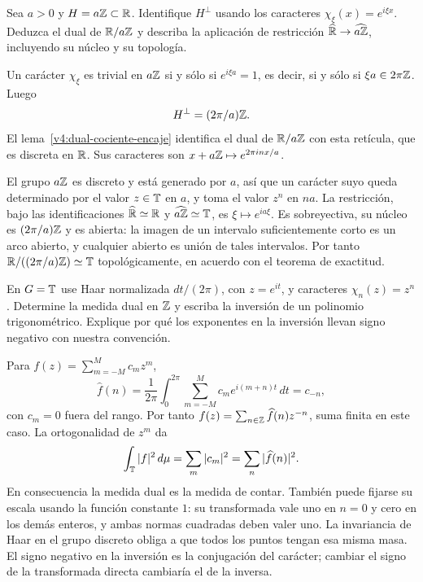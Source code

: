 \begin{ejercicio}\label{ej:v4-ampl-16-2}
Sea $a>0$ y $H=a\mathbb Z\subset\mathbb R$. Identifique $H^\perp$ usando los caracteres $\chi_\xi(x)=e^{i\xi x}$. Deduzca el dual de $\mathbb R/a\mathbb Z$ y describa la aplicación de restricción $\widehat{\mathbb R}\to\widehat{a\mathbb Z}$, incluyendo su núcleo y su topología.
\end{ejercicio}
\begin{solucion}
Un carácter $\chi_\xi$ es trivial en $a\mathbb Z$ si y sólo si $e^{i\xi a}=1$, es decir, si y sólo si $\xi a\in2\pi\mathbb Z$. Luego
\[
 H^\perp=(2\pi/a)\mathbb Z.
\]
El lema~\ref{v4:dual-cociente-encaje} identifica el dual de $\mathbb R/a\mathbb Z$ con esta retícula, que es discreta en $\mathbb R$. Sus caracteres son $x+a\mathbb Z\mapsto e^{2\pi i n x/a}$.

El grupo $a\mathbb Z$ es discreto y está generado por $a$, así que un carácter suyo queda determinado por el valor $z\in\mathbb T$ en $a$, y toma el valor $z^n$ en $na$. La restricción, bajo las identificaciones $\widehat{\mathbb R}\simeq\mathbb R$ y $\widehat{a\mathbb Z}\simeq\mathbb T$, es $\xi\mapsto e^{ia\xi}$. Es sobreyectiva, su núcleo es $(2\pi/a)\mathbb Z$ y es abierta: la imagen de un intervalo suficientemente corto es un arco abierto, y cualquier abierto es unión de tales intervalos. Por tanto $\mathbb R/((2\pi/a)\mathbb Z)\simeq\mathbb T$ topológicamente, en acuerdo con el teorema de exactitud.
\end{solucion}

\begin{ejercicio}\label{ej:v4-ampl-16-3}
En $G=\mathbb T$ use Haar normalizada $dt/(2\pi)$, con $z=e^{it}$, y caracteres $\chi_n(z)=z^n$. Determine la medida dual en $\mathbb Z$ y escriba la inversión de un polinomio trigonométrico. Explique por qué los exponentes en la inversión llevan signo negativo con nuestra convención.
\end{ejercicio}
\begin{solucion}
Para $f(z)=\sum_{m=-M}^M c_mz^m$,
\[
 \widehat f(n)=\frac1{2\pi}\int_0^{2\pi}
              \sum_{m=-M}^M c_me^{i(m+n)t}\,dt=c_{-n},
\]
con $c_m=0$ fuera del rango. Por tanto
$f(z)=\sum_{n\in\mathbb Z}\widehat f(n)z^{-n}$, suma finita en este caso. La ortogonalidad de $z^m$ da
\[
 \int_\mathbb T|f|^2\,d\mu=\sum_m|c_m|^2
 =\sum_n|\widehat f(n)|^2.
\]
En consecuencia la medida dual es la medida de contar. También puede fijarse su escala usando la función constante $1$: su transformada vale uno en $n=0$ y cero en los demás enteros, y ambas normas cuadradas deben valer uno. La invariancia de Haar en el grupo discreto obliga a que todos los puntos tengan esa misma masa. El signo negativo en la inversión es la conjugación del carácter; cambiar el signo de la transformada directa cambiaría el de la inversa.
\end{solucion}

